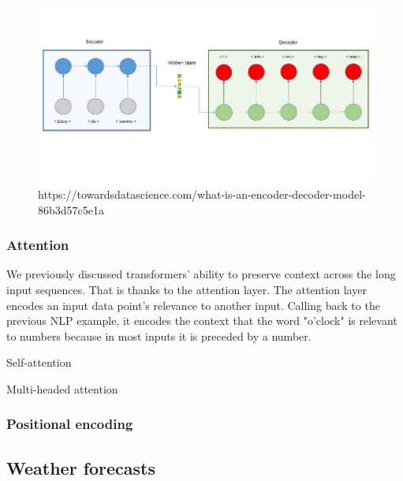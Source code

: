 \begin{figure}[ht!]
    \centering
    \includegraphics[scale=0.5]{imgs/encoder_decoder.jpeg}
    \caption{https://towardsdatascience.com/what-is-an-encoder-decoder-model-86b3d57c5e1a
    \label{fig:encoder_decoder}}
\end{figure}

\subsubsection{Attention} We previously discussed transformers' ability to preserve context across the long input sequences. That is thanks to the attention layer. The attention layer encodes an input data point's relevance to another input. Calling back to the previous NLP example, it encodes the context that the word "o'clock" is relevant to numbers because in most inputs it is preceded by a number.
 
Self-attention
 
Multi-headed attention
 
\subsubsection{Positional encoding}

\subsection{Weather forecasts}

